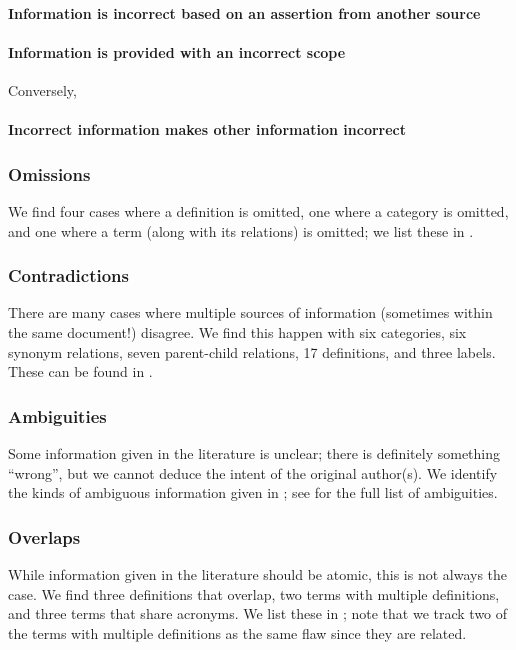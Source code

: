 \paragraph{Information is incorrect based on an assertion from another source}
\errorGuessFlaw{}

\paragraph{Information is provided with an incorrect scope}
\parSheetTestFlaw{} Conversely, \tolTestFlaw*{}

\paragraph{Incorrect information makes other information incorrect}
\redBoxFlaw{}

\subsubsection{Omissions}\label{miss}
We find four cases where a definition is omitted, one where a category is
omitted, and one where a term (along with its relations) is omitted\ifnotpaper;
we list these in \fi.

\subsubsection{Contradictions}\label{contra}
There are many cases where multiple sources of information (sometimes within
the same document!) disagree. We find this happen with six categories, six
synonym relations, seven parent-child relations, 17 definitions, and three
labels. \ifnotpaper These can be found in .\fi

\subsubsection{Ambiguities}\label{ambi}
Some information given in the literature is unclear; there is definitely
something ``wrong'', but we cannot deduce the intent of the original author(s).
We identify the kinds of ambiguous information given in %
\ifnotpaper; see  for the full list of ambiguities\fi.



\subsubsection{Overlaps}\label{over}
While information given in the literature should be atomic, this is not
always the case. We find three definitions that overlap, two terms with
multiple definitions, and three terms that share acronyms. \ifnotpaper We list
    these in ; note that we track two of the terms with
    multiple definitions as the same flaw since they are related. \fi

